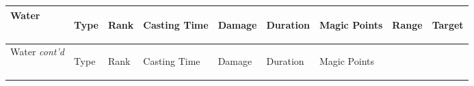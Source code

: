 \documentclass[twoside]{book}
\begin{document}
\begin{longtable}{p{1.25in}lp{2em}p{3em}llp{7em}ll} 
  Water
  &
  \begin{turn}{70}{Type}\end{turn}
          
  &
  \begin{turn}{70}{Rank}\end{turn}
          
  &
  \begin{turn}{70}{Casting Time}\end{turn}
          
  &
  \begin{turn}{70}{Damage}\end{turn}
          
  &
  \begin{turn}{70}{Duration}\end{turn}
          
  &
  \begin{turn}{70}{Magic Points}\end{turn}
          
  &
  \begin{turn}{70}{Range}\end{turn}
          
  &
  \begin{turn}{70}{Target}\end{turn}
          
  \\
  \hline
  \hline
  \endfirsthead
  Water \textit{cont'd}
        
  &
  \begin{turn}{70}{Type}\end{turn}
          
  &
  \begin{turn}{70}{Rank}\end{turn}
          
  &
  \begin{turn}{70}{Casting Time}\end{turn}
          
  &
  \begin{turn}{70}{Damage}\end{turn}
          
  &
  \begin{turn}{70}{Duration}\end{turn}
          
  &
  \begin{turn}{70}{Magic Points}\end{turn}
          

\end{longtable}
\end{document}
